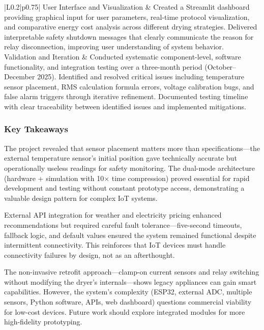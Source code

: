 \documentclass[11pt,a4paper]{article}
\begin{document}
\begin{longtable}{|L{0.2\textwidth}|p{0.75\textwidth}|}
\hline
User Interface and Visualization & Created a Streamlit dashboard providing graphical input for user parameters, real-time protocol visualization, and comparative energy cost analysis across different drying strategies. Delivered interpretable safety shutdown messages that clearly communicate the reason for relay disconnection, improving user understanding of system behavior. \\
\hline
Validation and Iteration & Conducted systematic component-level, software functionality, and integration testing over a three-month period (October--December 2025). Identified and resolved critical issues including temperature sensor placement, RMS calculation formula errors, voltage calibration bugs, and false alarm triggers through iterative refinement. Documented testing timeline with clear traceability between identified issues and implemented mitigations. \\
\hline
\end{longtable}

\subsubsection*{Key Takeaways}

The project revealed that sensor placement matters more than specifications—the external temperature sensor's initial position gave technically accurate but operationally useless readings for safety monitoring. The dual-mode architecture (hardware + simulation with 10× time compression) proved essential for rapid development and testing without constant prototype access, demonstrating a valuable design pattern for complex IoT systems.

External API integration for weather and electricity pricing enhanced recommendations but required careful fault tolerance—five-second timeouts, fallback logic, and default values ensured the system remained functional despite intermittent connectivity. This reinforces that IoT devices must handle connectivity failures by design, not as an afterthought.

The non-invasive retrofit approach—clamp-on current sensors and relay switching without modifying the dryer's internals—shows legacy appliances can gain smart capabilities. However, the system's complexity (ESP32, external ADC, multiple sensors, Python software, APIs, web dashboard) questions commercial viability for low-cost devices. Future work should explore integrated modules for more high-fidelity prototyping.



\newpage


\end{document}
